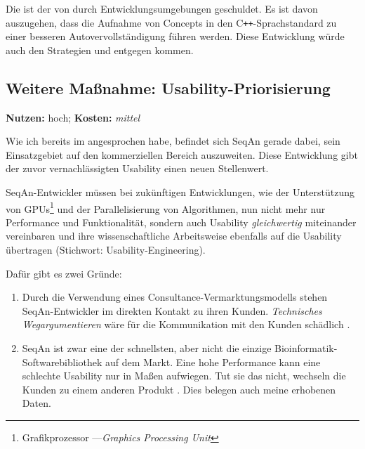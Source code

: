Die  ist der  von  durch Entwicklungsumgebungen geschuldet. Es ist davon auszugehen, dass die Aufnahme von Concepts in den C\texttt{++}-Sprachstandard zu einer besseren Autovervollständigung führen werden. Diese Entwicklung würde auch den Strategien  und  entgegen kommen.



\subsection{Weitere Maßnahme: Usability-Priorisierung}
\textbf{Nutzen:} hoch; \textbf{Kosten:} \textit{mittel}

Wie ich bereits im  angesprochen habe, befindet sich SeqAn gerade dabei, sein Einsatzgebiet auf den kommerziellen Bereich auszuweiten. Diese Entwicklung gibt der zuvor vernachlässigten Usability einen neuen Stellenwert.

SeqAn-Entwickler müssen bei zukünftigen Entwicklungen, wie der Unterstützung von GPUs\footnote{Grafikprozessor ---\textit{Graphics Processing Unit}} und der Parallelisierung von Algorithmen, nun nicht mehr nur Performance und Funktionalität, sondern auch Usability \textit{gleichwertig} miteinander vereinbaren und ihre wissenschaftliche Arbeitsweise ebenfalls auf die Usability übertragen (Stichwort: Usability-Engineering).

Dafür gibt es zwei Gründe:
\begin{enumerate}
  \item Durch die Verwendung eines Consultance-Vermarktungsmodells stehen SeqAn-Entwickler im direkten Kontakt zu ihren Kunden. \textit{Technisches Wegargumentieren} wäre für die Kommunikation mit den Kunden schädlich \citep{Sarodnick:2006vc}.
  \item SeqAn ist zwar eine der schnellsten, aber nicht die einzige Bioinformatik-Softwarebibliothek auf dem Markt. Eine hohe Performance kann eine schlechte Usability nur in Maßen aufwiegen. Tut sie das nicht, wechseln die Kunden zu einem anderen Produkt \citep{sunshine2014searching}. Dies belegen auch meine erhobenen Daten.  
\end{enumerate}  




